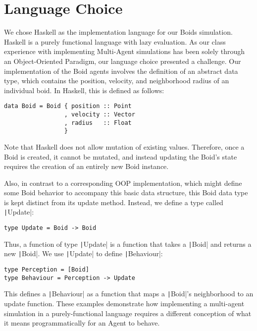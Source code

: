

\MYHEADERS{}
\section{Language Choice}

We chose Haskell as the implementation language for our Boids simulation.
Haskell is a purely functional language with lazy evaluation. As our class
experience with implementing Multi-Agent simulations has been solely through an
Object-Oriented Paradigm, our language choice presented a challenge. Our
implementation of the Boid agents involves the definition of an abstract data
type, which contains the position, velocity, and neighborhood radius of an
individual boid. In Haskell, this is defined as follows:

\begin{verbatim}
data Boid = Boid { position :: Point
                 , velocity :: Vector
                 , radius   :: Float
                 }
\end{verbatim}

Note that Haskell does not allow mutation of existing values. Therefore, once a
Boid is created, it cannot be mutated, and instead updating the Boid’s state
requires the creation of an entirely new Boid instance.

Also, in contrast to a corresponding OOP implementation, which might define some Boid behavior to accompany this basic data structure, this Boid data type is kept distinct from its update method. Instead, we define a type called \texttt|Update|:

\begin{verbatim}
type Update = Boid -> Boid
\end{verbatim}

Thus, a function of type \texttt|Update| is a function that takes a \texttt|Boid| and returns
a new \texttt|Boid|. We use \texttt|Update| to define \texttt|Behaviour|:

\begin{verbatim}
type Perception = [Boid]
type Behaviour = Perception -> Update
\end{verbatim}

This defines a \texttt|Behaviour| as a function that maps a \texttt|Boid|'s neighborhood to
an update function. These examples demonstrate how implementing a multi-agent
simulation in a purely-functional language requires a different conception of
what it means programmatically for an Agent to behave.
